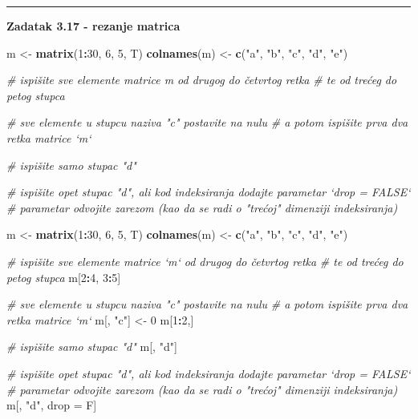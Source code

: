 \documentclass[]{book}
\newenvironment{Shaded}{\begin{snugshade}}{\end{snugshade}}
\newcommand{\KeywordTok}[1]{\textcolor[rgb]{0.13,0.29,0.53}{\textbf{#1}}}
\newcommand{\DecValTok}[1]{\textcolor[rgb]{0.00,0.00,0.81}{#1}}
\newcommand{\StringTok}[1]{\textcolor[rgb]{0.31,0.60,0.02}{#1}}
\newcommand{\CommentTok}[1]{\textcolor[rgb]{0.56,0.35,0.01}{\textit{#1}}}
\newcommand{\OperatorTok}[1]{\textcolor[rgb]{0.81,0.36,0.00}{\textbf{#1}}}
\newcommand{\NormalTok}[1]{#1}
\theoremstyle{definition}
\theoremstyle{definition}
\theoremstyle{definition}
\theoremstyle{remark}
\begin{document}
\begin{center}\rule{0.5\linewidth}{\linethickness}\end{center}

\textbf{Zadatak 3.17 - rezanje matrica}

\begin{Shaded}
\begin{Highlighting}[]
\NormalTok{m <-}\StringTok{ }\KeywordTok{matrix}\NormalTok{(}\DecValTok{1}\OperatorTok{:}\DecValTok{30}\NormalTok{, }\DecValTok{6}\NormalTok{, }\DecValTok{5}\NormalTok{, T)}
\KeywordTok{colnames}\NormalTok{(m) <-}\StringTok{ }\KeywordTok{c}\NormalTok{(}\StringTok{"a"}\NormalTok{, }\StringTok{"b"}\NormalTok{, }\StringTok{"c"}\NormalTok{, }\StringTok{"d"}\NormalTok{, }\StringTok{"e"}\NormalTok{)}

\CommentTok{# ispišite sve elemente matrice m od drugog do četvrtog retka}
\CommentTok{# te od trećeg do petog stupca}

\CommentTok{# sve elemente u stupcu naziva "c" postavite na nulu}
\CommentTok{# a potom ispišite prva dva retka matrice `m`}

\CommentTok{# ispišite samo stupac "d"}

\CommentTok{# ispišite opet stupac "d", ali kod indeksiranja dodajte parametar `drop = FALSE`}
\CommentTok{# parametar odvojite zarezom (kao da se radi o "trećoj" dimenziji indeksiranja)}
\end{Highlighting}
\end{Shaded}

\begin{Shaded}
\begin{Highlighting}[]
\NormalTok{m <-}\StringTok{ }\KeywordTok{matrix}\NormalTok{(}\DecValTok{1}\OperatorTok{:}\DecValTok{30}\NormalTok{, }\DecValTok{6}\NormalTok{, }\DecValTok{5}\NormalTok{, T)}
\KeywordTok{colnames}\NormalTok{(m) <-}\StringTok{ }\KeywordTok{c}\NormalTok{(}\StringTok{"a"}\NormalTok{, }\StringTok{"b"}\NormalTok{, }\StringTok{"c"}\NormalTok{, }\StringTok{"d"}\NormalTok{, }\StringTok{"e"}\NormalTok{)}

\CommentTok{# ispišite sve elemente matrice `m` od drugog do četvrtog retka}
\CommentTok{# te od trećeg do petog stupca}
\NormalTok{m[}\DecValTok{2}\OperatorTok{:}\DecValTok{4}\NormalTok{, }\DecValTok{3}\OperatorTok{:}\DecValTok{5}\NormalTok{]}

\CommentTok{# sve elemente u stupcu naziva "c" postavite na nulu}
\CommentTok{# a potom ispišite prva dva retka matrice `m`}
\NormalTok{m[, }\StringTok{"c"}\NormalTok{] <-}\StringTok{ }\DecValTok{0}
\NormalTok{m[}\DecValTok{1}\OperatorTok{:}\DecValTok{2}\NormalTok{,]}

\CommentTok{# ispišite samo stupac "d"}
\NormalTok{m[, }\StringTok{"d"}\NormalTok{]}

\CommentTok{# ispišite opet stupac "d", ali kod indeksiranja dodajte parametar `drop = FALSE`}
\CommentTok{# parametar odvojite zarezom (kao da se radi o "trećoj" dimenziji indeksiranja)}
\NormalTok{m[, }\StringTok{"d"}\NormalTok{, drop =}\StringTok{ }\NormalTok{F]}
\end{Highlighting}
\end{Shaded}
\end{document}
